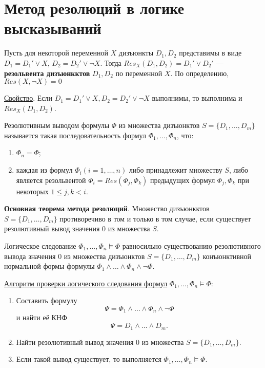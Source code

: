 \section{Метод резолюций в логике высказываний}
\dftion Пусть для некоторой переменной $X$ дизъюнкты $D_1, D_2$ представимы в виде $D_1 = D_1' \lor X$, $D_2 = D_2' \lor \lnot X$. Тогда $Res_X(D_1, D_2) = D_1' \lor D_2'$ --- \textbf{резольвента дизъюнкктов} $D_1, D_2$ по переменной $X$. По определению, $Res(X, \lnot X) = 0$

\underline{Свойство}. Если $D_1 = D_1' \lor X, D_2 = D_2' \lor \lnot X$ выполнимы, то выполнима и $Res_X(D_1, D_2)$.

\dftion Резолютивным выводом формулы $\Phi$ из множества дизъюнктов $S = \{D_1, \dots, D_m\}$ называется такая последовательность формул $\Phi_1, \dots, \Phi_n$, что:
\begin{enumerate}
    \item $\Phi_n = \Phi$;
    \item каждая из формул $\Phi_i (i = 1,\dots,n)$ либо принадлежит множеству $S$, либо является резольвентой $\Phi_i = Res(\Phi_j, \Phi_k)$ предыдущих формул $\Phi_j, \Phi_k$ при некоторых $1 \leq j, k < i$.
\end{enumerate}

\textbf{Основная теорема метода резолюций}. Множество дизъюнкктов $S=\{D_1,\dots,D_m\}$ противоречиво в том и только в том случае, если существует резолютивный вывод значения 0 из множества $S$.

Логическое следование $\Phi_1, \dots, \Phi_n \vDash \Phi$ равносильно существованию резолютивного вывода значения 0 из множества дизъюнктов $S = \{D_1, \dots, D_m\}$ конъюнктивной нормальной формы формулы $\Phi_1 \land \dots \land \Phi_n \land \lnot \Phi$.

\underline{Алгоритм проверки логического следования формул} $\Phi_1, \dots, \Phi_n \vDash \Phi$:
\begin{enumerate}
    \item Составить формулу $$\Psi = \Phi_1 \land \dots \land \Phi_n \land \lnot \Phi$$ и найти её КНФ $$\Psi = D_1 \land \dots \land D_m.$$
    \item Найти резолютивный вывод значения 0 из множества $S = \{D_1, \dots, D_m\}$.
    \item Если такой вывод существует, то выполняется $\Phi_1, \dots, \Phi_n \vDash \Phi$.
\end{enumerate}